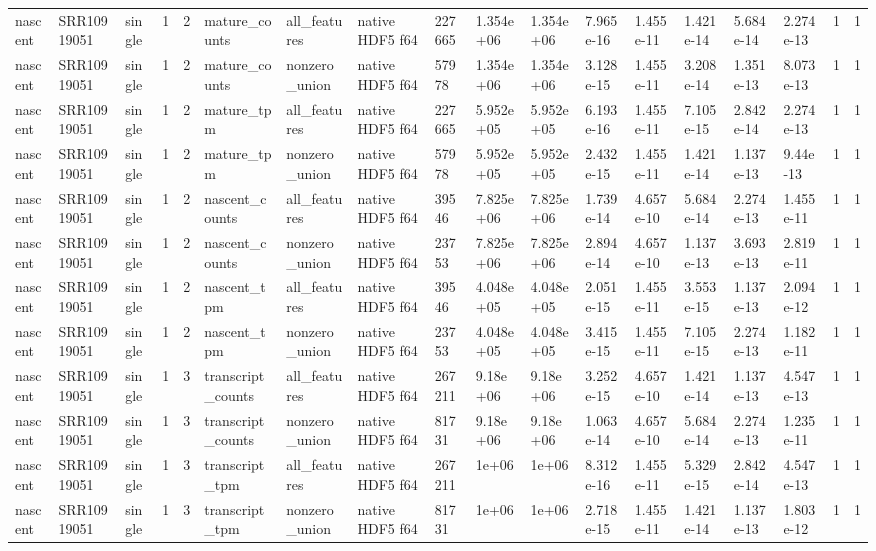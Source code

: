 \begin{tabular}{llllllllllllllllll}
nascent & SRR10919051 & single & 1 & 2 & mature\_counts & all\_features & native HDF5 f64 & 227665 & 1.354e+06 & 1.354e+06 & 7.965e-16 & 1.455e-11 & 1.421e-14 & 5.684e-14 & 2.274e-13 & 1 & 1 \\
nascent & SRR10919051 & single & 1 & 2 & mature\_counts & nonzero\_union & native HDF5 f64 & 57978 & 1.354e+06 & 1.354e+06 & 3.128e-15 & 1.455e-11 & 3.208e-14 & 1.351e-13 & 8.073e-13 & 1 & 1 \\
nascent & SRR10919051 & single & 1 & 2 & mature\_tpm & all\_features & native HDF5 f64 & 227665 & 5.952e+05 & 5.952e+05 & 6.193e-16 & 1.455e-11 & 7.105e-15 & 2.842e-14 & 2.274e-13 & 1 & 1 \\
nascent & SRR10919051 & single & 1 & 2 & mature\_tpm & nonzero\_union & native HDF5 f64 & 57978 & 5.952e+05 & 5.952e+05 & 2.432e-15 & 1.455e-11 & 1.421e-14 & 1.137e-13 & 9.44e-13 & 1 & 1 \\
nascent & SRR10919051 & single & 1 & 2 & nascent\_counts & all\_features & native HDF5 f64 & 39546 & 7.825e+06 & 7.825e+06 & 1.739e-14 & 4.657e-10 & 5.684e-14 & 2.274e-13 & 1.455e-11 & 1 & 1 \\
nascent & SRR10919051 & single & 1 & 2 & nascent\_counts & nonzero\_union & native HDF5 f64 & 23753 & 7.825e+06 & 7.825e+06 & 2.894e-14 & 4.657e-10 & 1.137e-13 & 3.693e-13 & 2.819e-11 & 1 & 1 \\
nascent & SRR10919051 & single & 1 & 2 & nascent\_tpm & all\_features & native HDF5 f64 & 39546 & 4.048e+05 & 4.048e+05 & 2.051e-15 & 1.455e-11 & 3.553e-15 & 1.137e-13 & 2.094e-12 & 1 & 1 \\
nascent & SRR10919051 & single & 1 & 2 & nascent\_tpm & nonzero\_union & native HDF5 f64 & 23753 & 4.048e+05 & 4.048e+05 & 3.415e-15 & 1.455e-11 & 7.105e-15 & 2.274e-13 & 1.182e-11 & 1 & 1 \\
nascent & SRR10919051 & single & 1 & 3 & transcript\_counts & all\_features & native HDF5 f64 & 267211 & 9.18e+06 & 9.18e+06 & 3.252e-15 & 4.657e-10 & 1.421e-14 & 1.137e-13 & 4.547e-13 & 1 & 1 \\
nascent & SRR10919051 & single & 1 & 3 & transcript\_counts & nonzero\_union & native HDF5 f64 & 81731 & 9.18e+06 & 9.18e+06 & 1.063e-14 & 4.657e-10 & 5.684e-14 & 2.274e-13 & 1.235e-11 & 1 & 1 \\
nascent & SRR10919051 & single & 1 & 3 & transcript\_tpm & all\_features & native HDF5 f64 & 267211 & 1e+06 & 1e+06 & 8.312e-16 & 1.455e-11 & 5.329e-15 & 2.842e-14 & 4.547e-13 & 1 & 1 \\
nascent & SRR10919051 & single & 1 & 3 & transcript\_tpm & nonzero\_union & native HDF5 f64 & 81731 & 1e+06 & 1e+06 & 2.718e-15 & 1.455e-11 & 1.421e-14 & 1.137e-13 & 1.803e-12 & 1 & 1 \\

\end{tabular}
